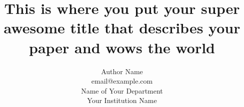 \documentclass[12pt]{article}
\title{\large This is where you put your super awesome title that describes your paper and wows the world}
\author{\normalsize Author Name\\\normalsize email@example.com\\\normalsize Name of Your Department\\\normalsize Your Institution Name}
\date{} %
\begin{document}
\maketitle



\begin{abstract} %

\end{abstract}
\end{document}
